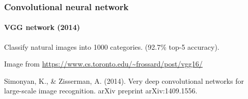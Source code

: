 \documentclass[9pt]{beamer}
\begin{document}

\begin{frame}

  \frametitle{Convolutional neural network}

  \framesubtitle{VGG network (2014)}

  \begin{center}
  \end{center}

  Classify natural images into 1000 categories. (92.7\% top-5
  accuracy).

  \medskip

  {\footnotesize Image from
    \url{https://www.cs.toronto.edu/~frossard/post/vgg16/}}

  \smallskip

  {\footnotesize Simonyan, K., \& Zisserman, A. (2014). Very deep
    convolutional networks for large-scale image recognition. arXiv
    preprint arXiv:1409.1556.}
\end{frame}
\end{document}
